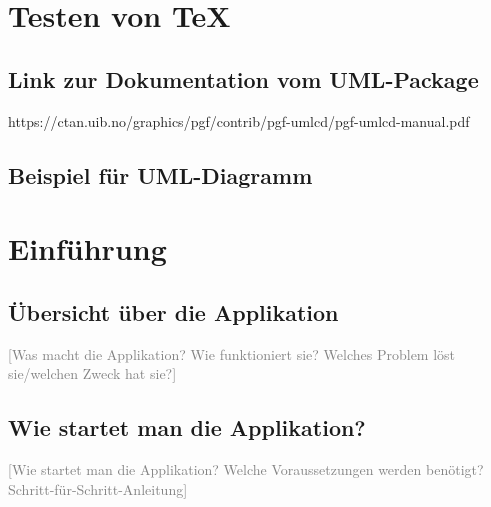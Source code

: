 \documentclass[a4paper,12pt]{article}
\newcommand{\placeholder}[1]{\textcolor{gray}{[#1]}}
\begin{document}
\section{Testen von TeX}
\subsection{Link zur Dokumentation vom UML-Package}
https://ctan.uib.no/graphics/pgf/contrib/pgf-umlcd/pgf-umlcd-manual.pdf
\subsection{Beispiel für UML-Diagramm}


\section{Einführung}

\subsection*{Übersicht über die Applikation}

\placeholder{Was macht die Applikation? Wie funktioniert sie? Welches Problem löst sie/welchen Zweck hat sie?}


\subsection*{Wie startet man die Applikation?}

\placeholder{Wie startet man die Applikation? Welche Voraussetzungen werden benötigt? Schritt-für-Schritt-Anleitung}
\end{document}
